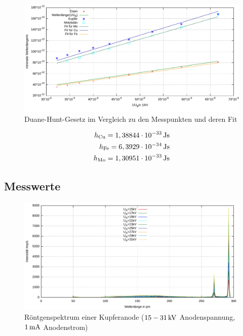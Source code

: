\documentclass[numbers=noenddot,12pt,a4paper]{scrartcl}
\newcommand{\ix}[1]{_\text{#1}}
\begin{document}
\begin{figure}[H]
	\centering
	\includegraphics[width=\textwidth]{duane.pdf}
	\caption{Duane-Hunt-Gesetz im Vergleich zu den Messpunkten und deren Fit}\label{img:duane}
\end{figure}
\begin{align}
	h\ix{Cu}=\unit[1,38844\cdot10^{-33}]{Js} \label{eq:h1}\\
		h\ix{Fe}=\unit[6,3929\cdot10^{-34}]{Js} \\
			h\ix{Mo}=\unit[1,30951\cdot10^{-33}]{Js} \label{eq:h2}
\end{align}
\subsection{Messwerte}\label{subsec:mess}
\begin{figure}[H]
	\centering
	\includegraphics[width=\textwidth]{kupferges.pdf}
	\caption{Röntgenspektrum einer Kupferanode ($\unit[15-31]{kV}$ Anodenspannung, $\unit[1]{mA}$ Anodenstrom)}
\end{figure}
\end{document}
